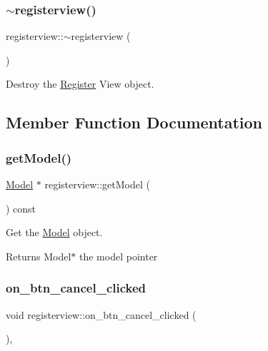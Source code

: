 \subsubsection{\texorpdfstring{$\sim$registerview()}{~registerview()}}
{\footnotesize\ttfamily registerview\+::$\sim$registerview (\begin{DoxyParamCaption}{ }\end{DoxyParamCaption})}



Destroy the \hyperlink{classRegister}{Register} View object. 



\subsection{Member Function Documentation}
\mbox{\label{classregisterview_a765c4046d743e6f3908615535c16eef1}} 
\subsubsection{\texorpdfstring{get\+Model()}{getModel()}}
{\footnotesize\ttfamily \hyperlink{classModel}{Model} $\ast$ registerview\+::get\+Model (\begin{DoxyParamCaption}{ }\end{DoxyParamCaption}) const}



Get the \hyperlink{classModel}{Model} object. 

\begin{DoxyReturn}{Returns}
Model$\ast$ the model pointer 
\end{DoxyReturn}
\mbox{\label{classregisterview_a5541faebc6701e8e2da6a4c107cd4b0e}} 
\subsubsection{\texorpdfstring{on\+\_\+btn\+\_\+cancel\+\_\+clicked}{on\_btn\_cancel\_clicked}}
{\footnotesize\ttfamily void registerview\+::on\+\_\+btn\+\_\+cancel\+\_\+clicked (\begin{DoxyParamCaption}{ }\end{DoxyParamCaption})\hspace{0.3cm}{\ttfamily [private]}, {\ttfamily [slot]}}



